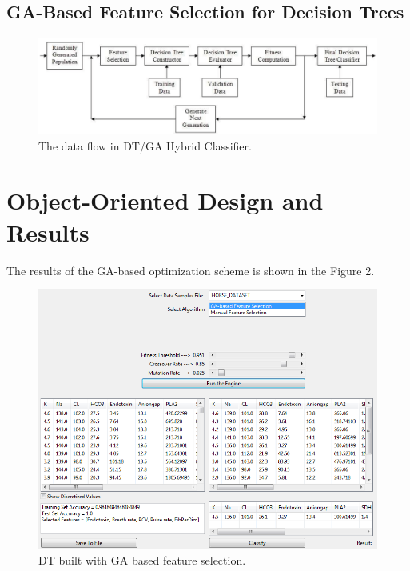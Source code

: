 \documentclass[conference]{IEEEtran}
\begin{document}
\subsection{GA-Based Feature Selection for Decision Trees}
\begin{figure}[h!]
  
  \centering
    \includegraphics[scale=0.25]{dfd.png}
\caption{The data flow in DT/GA Hybrid Classifier.}
\end{figure}



\section{Object-Oriented Design and Results}






The results of the GA-based optimization scheme is shown in the Figure 2.
\begin{figure}[h!]
  
  \centering
    \includegraphics[scale=0.4]{ga_algo_stats.png}
\caption{DT built with GA based feature selection.}
\end{figure}
\end{document}
